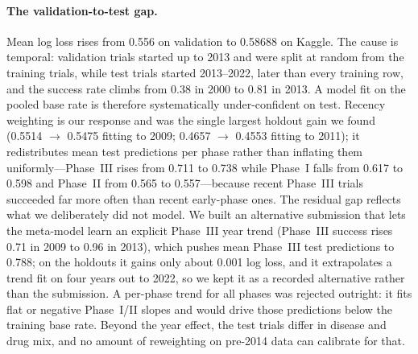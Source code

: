 \paragraph{The validation-to-test gap.}
Mean log loss rises from 0.556 on validation to 0.58688 on Kaggle. The cause is
temporal: validation trials started up to 2013 and were split at random from the
training trials, while test trials started 2013--2022, later than every training
row, and the success rate climbs from 0.38 in 2000 to 0.81 in 2013. A model fit on
the pooled base rate is therefore systematically under-confident on test. Recency
weighting is our response and was the single largest holdout gain we found
(0.5514 $\to$ 0.5475 fitting to 2009; 0.4657 $\to$ 0.4553 fitting to 2011); it
redistributes mean test predictions per phase rather than inflating them
uniformly---Phase~III rises from 0.711 to 0.738 while Phase~I falls from 0.617 to
0.598 and Phase~II from 0.565 to 0.557---because recent Phase~III trials succeeded
far more often than recent early-phase ones. The residual gap reflects what we deliberately did not model. We
built an alternative submission that lets the meta-model learn an explicit
Phase~III year trend (Phase~III success rises 0.71 in 2009 to 0.96 in 2013), which
pushes mean Phase~III test predictions to 0.788; on the holdouts it gains only
about 0.001 log loss, and it extrapolates a trend fit on four years out to 2022,
so we kept it as a recorded alternative rather than the submission. A per-phase
trend for all phases was rejected outright: it fits flat or negative Phase~I/II
slopes and would drive those predictions below the training base rate. Beyond the
year effect, the test trials differ in disease and drug mix, and no amount of
reweighting on pre-2014 data can calibrate for that.
